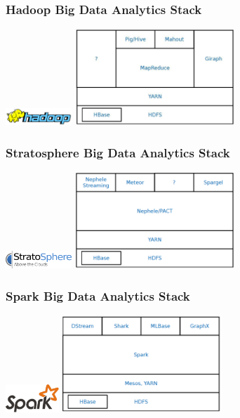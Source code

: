 \documentclass{beamer}
\begin{document}
\begin{frame}
\frametitle{Hadoop Big Data Analytics Stack}
\hspace*{4.7cm}\includegraphics[width=2.5cm]{figs/hadoop.pdf}
\vspace{0.5cm}
\hspace*{3cm}\includegraphics[width=6cm]{figs/stack_hadoop.pdf}
\end{frame}

\begin{frame}
\frametitle{Stratosphere Big Data Analytics Stack}
\hspace*{4.5cm}\includegraphics[width=2.5cm]{figs/stratosphere.pdf}
\vspace{0.5cm}
\hspace*{3cm}\includegraphics[width=6cm]{figs/stack_stratosphere.pdf}
\end{frame}

\begin{frame}
\frametitle{Spark Big Data Analytics Stack}
\hspace*{5cm}\includegraphics[width=2cm]{figs/spark.pdf}
\vspace{0.5cm}
\hspace*{3cm}\includegraphics[width=6cm]{figs/stack_spark.pdf}
\end{frame}
\end{document}
